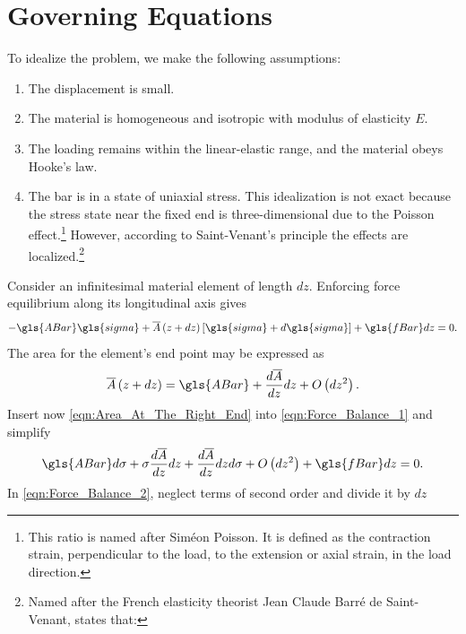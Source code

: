 \section{Governing Equations} \label{cha:Problem_Formulation}
To idealize the problem, we make the following assumptions:
\begin{enumerate}
	\item The displacement is small.
	\item The material is homogeneous and isotropic with modulus of elasticity $E$.
	\item The loading remains within the linear-elastic range, and the material obeys Hooke's law.
	\item The bar is in a state of uniaxial stress. This idealization is not exact because the stress state near the fixed end is
	three-dimensional due to the Poisson effect.\footnote{This ratio is named after Sim\'{e}on Poisson.
	It is defined as the contraction strain, perpendicular to the load, to the extension or axial strain, in the load direction.}
	However, according to Saint-Venant's principle the effects are localized.\footnote{Named after the French elasticity theorist
	Jean Claude Barr\'{e} de Saint-Venant, states that:}
\end{enumerate}	\text{}
Consider an infinitesimal material element of length $dz$. Enforcing force equilibrium along its longitudinal axis gives
\begin{equation}	\label{eqn:Force_Balance_1}
	-\gls{ABar} \gls{sigma} + \overline{A} \left( z + dz \right) \left[ \gls{sigma} + d \gls{sigma} \right] + \gls{fBar} dz = 0.
\end{equation}
The area for the element's end point may be expressed as
\begin{equation}	\label{eqn:Area_At_The_Right_End}
	\overline{A} \left( z + dz \right) = \gls{ABar} + \frac{ d \overline{A} }{ dz } dz + O \left( dz^2 \right).
\end{equation}
Insert now \cref{eqn:Area_At_The_Right_End} into \cref{eqn:Force_Balance_1} and simplify
\begin{equation}	\label{eqn:Force_Balance_2}
	\gls{ABar} d \sigma + \sigma \frac{ d \overline{A} }{ dz } dz + \frac{ d \overline{A} }{ dz } dz d \sigma + O \left( dz^2
	\right) + \gls{fBar} dz = 0.
\end{equation}
In \cref{eqn:Force_Balance_2}, neglect terms of second order and divide it by $dz$
